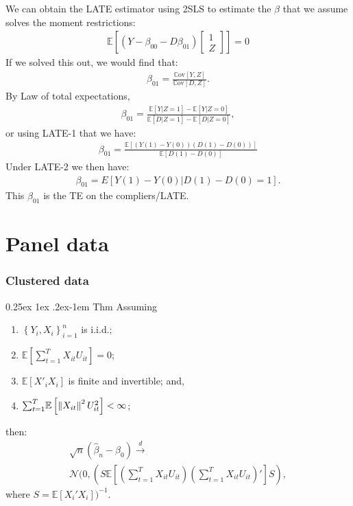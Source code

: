 \documentclass[9pt]{extarticle}
\makeatletter
\newcommand{\EE}{\mathbb{E}}
\newcommand{\ssum}{\bgroup \textstyle \sum \egroup}
\renewcommand{\paragraph}{%
  \@startsection{paragraph}{4}%
  {\z@}{0.25ex \@plus 1ex \@minus .2ex}{-1em}%
  {\normalfont\normalsize\bfseries}%
}
\newcommand{\darrow}{\overset{d}{\rightarrow}}
\makeatother
\begin{document}
\begin{multicols*}{4}
We can obtain the LATE estimator using 2SLS to estimate the $\beta$ that we assume solves the moment restrictions:
\begin{gather*}
    \EE[\left(Y-\beta_{00}-D\beta_{01}\right)\begin{bmatrix}
1\\
Z
\end{bmatrix}]=0
\end{gather*}
If we solved this out, we would find that:
\begin{gather*}
    \beta_{01}=\frac{\mathbb{C}\text{ov}[Y,Z]}{\mathbb{C}\text{ov}[ D,Z ]}.
\end{gather*}
By Law of total expectations,
\begin{gather*}
    \beta_{01}=\frac{\EE\left[Y|Z=1\right]-\EE\left[Y|Z=0\right]}{\EE\left[D|Z=1\right]-\EE\left[D|Z=0\right]},
\end{gather*}
or using LATE-1 that we have:
\begin{gather*}
\beta_{01}=\frac{\EE\left[\left(Y\left(1\right)-Y\left(0\right)\right)\left(D\left(1\right)-D\left(0\right)\right)\right]}{\EE\left[D\left(1\right)-D\left(0\right)\right]}
\end{gather*}
Under LATE-2 we then have:
\begin{gather*}
\beta_{01}=E\left[Y\left(1\right)-Y\left(0\right)|D\left(1\right)-D\left(0\right)=1\right].
\end{gather*}
This $\beta_{01}$ is the TE on the compliers/LATE.


\section*{Panel data}
\subsubsection*{Clustered data}

\paragraph{Thm} Assuming
\begin{enumerate}
\item $\left\{ Y_{i},X_{i}\right\} _{i=1}^{n}$ is i.i.d.;
\item $\EE\left[\sum_{t=1}^{T}X_{it}U_{it}\right]=0$; 
\item $\EE\left[X'_{i}X_{i}\right]$ is finite and invertible; and,
\item $\ssum_{t=1}^{T}\EE\left[\left\Vert X_{it}\right\Vert ^{2}U_{it}^{2}\right]<\infty$;
\end{enumerate}
then:
\begin{gather*}
    \sqrt{n}(\hat{\beta}_{n}-\beta_{0}) \darrow \\
    \mathcal{N}(0, (
   S\EE[(\sum_{t=1}^T X_{it}U_{it})(\sum_{t=1}^{T} X_{it}U_{it})']S),
\end{gather*}
where $S =  \EE[X_{i}'X_{i}])^{-1}$.


\end{multicols*}
\end{document}

